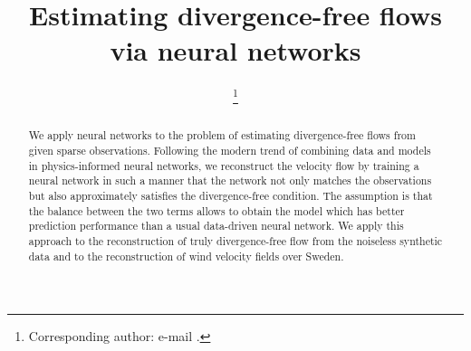 \documentclass[pamm,a4paper,fleqn]{w-art}
\begin{document}

\TitleLanguage[EN]
\title[Divergence-free neural networks]{Estimating divergence-free flows via
  neural networks}

\author{ %
\footnote{Corresponding author:
  e-mail .}} 
\author{ }
\author{ }
\author{ }

\address[\inst{1}]{\CountryCode[DE]RWTH Aachen University, Pontdriesch 14--16,
  Aachen 52062, Germany}
\address[\inst{2}]{\CountryCode[SE]KTH Royal Institute of Technology,
  SE-100 44 Stockholm, Sweden}
\address[\inst{3}]{\CountryCode[SA]King Abdullah University of Science and
  Technology, Thuwal, 23955-6900, Saudi Arabia}
\AbstractLanguage[EN]
\begin{abstract}
We apply neural networks to the problem of estimating divergence-free flows from
given sparse observations.
Following the modern trend of combining data and models in
physics-informed neural networks, we reconstruct the velocity flow
by training a neural network in such a manner that the network not
only matches the observations but also approximately satisfies the
divergence-free condition.
The assumption is that the balance between the two terms allows
to obtain the model which has better prediction performance than a usual
data-driven neural network.
We apply this
approach to the reconstruction of truly divergence-free flow from the noiseless
synthetic data and to the reconstruction of wind velocity fields over Sweden.
\end{abstract}
\maketitle                   %
\end{document}
